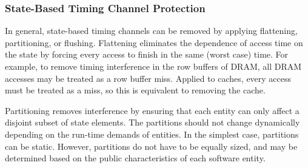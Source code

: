 \subsubsection{State-Based Timing Channel Protection}

In general, state-based timing channels can be removed by applying 
flattening, partitioning, or flushing.
Flattening eliminates the dependence of access time on the state by forcing 
every access to finish in the same (worst case) time. For example, to remove 
timing interference in the row buffers of DRAM, all DRAM accesses may be 
treated as a row buffer miss.
Applied to caches, every 
access must be treated as a miss, so this is equivalent to removing the cache. 

Partitioning removes interference by ensuring that each entity can
only affect a disjoint subset of state elements. The partitions
should not change dynamically depending on the run-time demands of entities.
In the simplest case, partitions can be static.
However, partitions do not have to be equally sized, and may be determined 
based on the public characteristics
of each software entity.


